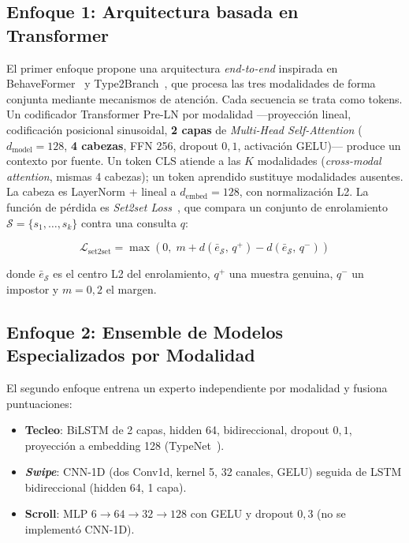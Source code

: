 \subsection{Enfoque 1: Arquitectura basada en Transformer}

El primer enfoque propone una arquitectura \textit{end-to-end} inspirada en BehaveFormer~\cite{senerath2023behaveformer}
 y Type2Branch~\cite{gonzalez2025type2branch}, que procesa las tres modalidades de forma conjunta 
 mediante mecanismos de atención.
Cada secuencia se trata como tokens. Un codificador Transformer Pre-LN por modalidad ---proyección lineal, 
codificación posicional sinusoidal, \textbf{2 capas} de \textit{Multi-Head Self-Attention} ($d_{\mathrm{model}}=128$, 
\textbf{4 cabezas}, FFN 256, dropout $0{,}1$, activación GELU)--- produce un contexto por fuente. Un token CLS atiende 
a las $K$ modalidades (\textit{cross-modal attention}, mismas 4 cabezas); un token aprendido sustituye modalidades 
ausentes. La cabeza es LayerNorm + lineal a $d_{\mathrm{embed}}=128$, con normalización L2.
La función de pérdida es \textit{Set2set Loss}~\cite{gonzalez2025type2branch}, 
que compara un conjunto de enrolamiento $\mathcal{S} = \{s_1, \ldots, s_k\}$ contra una consulta $q$:

\begin{equation}
    \mathcal{L}_{\text{set2set}} = \max\left(0,\; m + d\!\left(\bar{e}_{\mathcal{S}},\, q^+\right) - d\!\left(\bar{e}_{\mathcal{S}},\, q^-\right)\right)
    \label{eq:set2set}
\end{equation}

donde $\bar{e}_{\mathcal{S}}$ es el centro L2 del enrolamiento, 
$q^+$ una muestra genuina, $q^-$ un impostor y $m=0{,}2$ el margen.

\subsection{Enfoque 2: Ensemble de Modelos Especializados por Modalidad}

El segundo enfoque entrena un experto independiente por modalidad y fusiona puntuaciones:

\begin{itemize}
    \item \textbf{Tecleo}: BiLSTM de 2 capas, hidden 64, bidireccional, dropout $0{,}1$, proyección a embedding 128 (TypeNet~\cite{acien2022typenet}).
    \item \textbf{\textit{Swipe}}: CNN-1D (dos Conv1d, kernel 5, 32 canales, GELU) seguida de LSTM bidireccional (hidden 64, 1 capa).
    \item \textbf{Scroll}: MLP $6\to 64\to 32\to 128$ con GELU y dropout $0{,}3$ (no se implementó CNN-1D).
\end{itemize}

